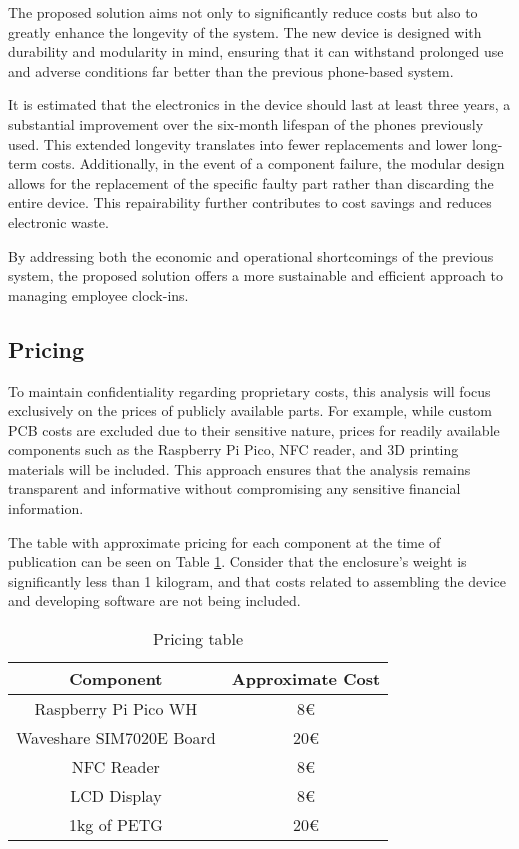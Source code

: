 The proposed solution aims not only to significantly reduce costs but also to greatly enhance the 
longevity of the system. The new device is designed with durability and modularity in mind, 
ensuring that it can withstand prolonged use and adverse conditions far better than the previous 
phone-based system.

It is estimated that the electronics in the device should last at least three years, a substantial 
improvement over the six-month lifespan of the phones previously used. This extended longevity 
translates into fewer replacements and lower long-term costs. Additionally, in the event of a 
component failure, the modular design allows for the replacement of the specific faulty part 
rather than discarding the entire device. This repairability further contributes to cost savings 
and reduces electronic waste.

By addressing both the economic and operational shortcomings of the previous system, the proposed 
solution offers a more sustainable and efficient approach to managing employee clock-ins.

\subsection{Pricing}

To maintain confidentiality regarding proprietary costs, this analysis will focus exclusively on 
the prices of publicly available parts. For example, while custom PCB costs are excluded due to 
their sensitive nature, prices for readily available components such as the Raspberry Pi Pico, NFC 
reader, and 3D printing materials will be included. This approach ensures that the analysis 
remains transparent and informative without compromising any sensitive financial information.

The table with approximate pricing for each component at the time of publication can be seen on 
Table \ref{tab:pricing_table}. Consider that the enclosure's weight is significantly less than 1 
kilogram, and that costs related to assembling the device and developing software are not being 
included.


\begin{table}
	\centering
	\begin{tabular}{c|c}
		\textbf{Component} & \textbf{Approximate Cost} \\
		\hline\hline
		Raspberry Pi Pico WH & 8€\\
		Waveshare SIM7020E Board & 20€\\
		NFC Reader & 8€\\
		LCD Display & 8€\\
		1kg of PETG & 20€\\
		\hline
	\end{tabular}
	\caption{Pricing table}
	\label{tab:pricing_table}
\end{table}
